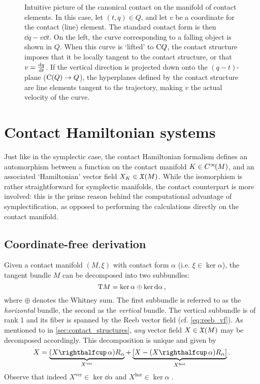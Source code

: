 \begin{figure}[h!]
    \centering
    
    \caption{Intuitive picture of the canonical contact on the manifold of contact elements. In this case, let \( (t, q) \in Q\), and let \(v\) be a coordinate for the contact (line) element. The standard contact form is then \(\dd{q} - v\dd{t}\). On the left, the curve corresponding to a falling object is shown in \(Q\). When this curve is `lifted' to \(\mathrm{C}Q\), the contact structure imposes that it be locally tangent to the contact structure, or that \(v = \dv{q}{t}\). If the vertical direction is projected down onto the \((q-t)\)-plane (\(\mathrm{C}(Q) \to Q\)), the hyperplanes defined by the contact structure are line elements tangent to the trajectory, making \(v\) the actual velocity of the curve.}
    \label{fig:contact_lift}
\end{figure}

\section{Contact Hamiltonian systems}
\label{sec:contact_ham_systems}

\label{ssec:contact_ham_vfields}
Just like in the symplectic case, the contact Hamiltonian formalism defines an automorphism between a function on the contact manifold \(K \in C^\infty\!\qty(M)\), and an associated `Hamiltonian' vector field \(X_K \in \mathfrak{X}\qty(M)\). While the isomorphism is rather straightforward for symplectic manifolds, the contact counterpart is more involved: this is the prime reason behind the computational advantage of symplectification, as opposed to performing the calculations directly on the contact manifold.

\subsection*{Coordinate-free derivation} Given a contact manifold \((M, \xi)\) with contact form \(\alpha\) (i.e. \(\xi \in \ker \alpha\)), the tangent bundle \(M\) can be decomposed into two subbundles: \cite{Libermann1987,Cannas2001}
\begin{equation}
     \mathrm{T}M = \ker \alpha \oplus \ker \dd{\alpha},
\end{equation}
where \(\oplus\) denotes the Whitney sum. The first subbundle is referred to as the \emph{horizontal} bundle, the second as the \emph{vertical}
 bundle. The vertical subbundle is of rank 1 and its fiber is spanned by the Reeb vector field (cf. \cref{eq:reeb_vf}). As mentioned to in \cref{sec:contact_structures}, \emph{any} vector field \(X \in \mathfrak{X}\qty(M)\) may be decomposed accordingly. This decomposition is unique and given by
\begin{equation}
    X = \underbrace{(\intpr{X}{\alpha})R_\alpha}_{X^\text{ver}} + \underbrace{\qty[X - (\intpr{X}{\alpha})R_\alpha]}_{X^\text{hor}}.
    \label{eq:contact_vf_decomp}
\end{equation}
Observe that indeed \(X^\text{ver} \in \ker \dd{\alpha}\) and \(X^\text{hor} \in \ker \alpha\) \cite{Cannas2001,DeLeon2020,Libermann1987}.


